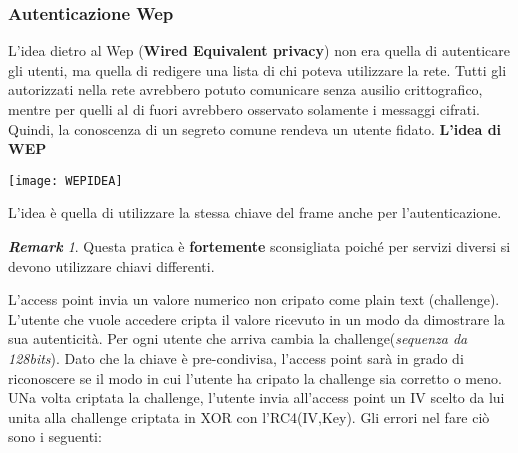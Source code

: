 \documentclass{article}
\theoremstyle{remark}
\newtheorem*{remark}{\textbf{Remark}}
\begin{document}
\subsubsection{Autenticazione Wep}
L'idea dietro al Wep (\textbf{Wired Equivalent privacy}) non era quella di autenticare gli utenti, ma quella di redigere una lista di chi poteva utilizzare la rete. Tutti gli autorizzati nella rete avrebbero potuto comunicare senza ausilio crittografico, mentre per quelli al di fuori avrebbero osservato solamente i messaggi cifrati. Quindi, la conoscenza di un segreto comune rendeva un utente fidato.
\textbf{L'idea di WEP}
\begin{center}
    \texttt{[image: WEPIDEA]}
\end{center}
L'idea è quella di utilizzare la stessa chiave del frame anche per l'autenticazione.
\begin{remark}
Questa pratica è \textbf{fortemente} sconsigliata poiché per servizi diversi si devono utilizzare chiavi differenti.
\end{remark}
L'access point invia un valore numerico non cripato come plain text (challenge). L'utente che vuole accedere cripta il valore ricevuto in un modo da dimostrare la sua autenticità. Per ogni utente che arriva cambia la challenge(\emph{sequenza da 128bits}).\newline
Dato che la chiave è pre-condivisa, l'access point sarà in grado di riconoscere se il modo in cui l'utente ha cripato la challenge sia corretto o meno. UNa volta criptata la challenge, l'utente invia all'access point un IV scelto da lui unita alla challenge criptata in XOR con l'RC4(IV,Key).
Gli errori nel fare ciò sono i seguenti:
\end{document}
